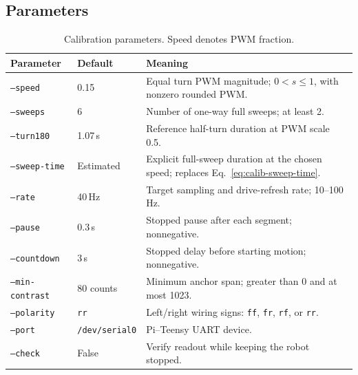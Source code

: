 \subsection{Parameters}
\begin{table}[H]
\centering\small
\caption{Calibration parameters. Speed denotes PWM fraction.}
\label{tab:photo3-calib-parameters}
\begin{tabular}{@{}L{3.4cm}L{2.7cm}L{10.0cm}@{}}
\toprule
\textbf{Parameter} & \textbf{Default} & \textbf{Meaning} \\
\midrule
\texttt{--speed} & 0.15 & Equal turn PWM magnitude; $0<s\le1$, with nonzero rounded PWM. \\
\texttt{--sweeps} & 6 & Number of one-way full sweeps; at least 2. \\
\texttt{--turn180} & 1.07\,s & Reference half-turn duration at PWM scale 0.5. \\
\texttt{--sweep-time} & Estimated & Explicit full-sweep duration at the chosen speed; replaces Eq.~\eqref{eq:calib-sweep-time}. \\
\texttt{--rate} & 40\,Hz & Target sampling and drive-refresh rate; 10--100\,Hz. \\
\texttt{--pause} & 0.3\,s & Stopped pause after each segment; nonnegative. \\
\texttt{--countdown} & 3\,s & Stopped delay before starting motion; nonnegative. \\
\texttt{--min-contrast} & 80 counts & Minimum anchor span; greater than 0 and at most 1023. \\
\texttt{--polarity} & \texttt{rr} & Left/right wiring signs: \texttt{ff}, \texttt{fr}, \texttt{rf}, or \texttt{rr}. \\
\texttt{--port} & \texttt{/dev/serial0} & Pi--Teensy UART device. \\
\texttt{--check} & False & Verify readout while keeping the robot stopped. \\
\bottomrule
\end{tabular}
\end{table}
